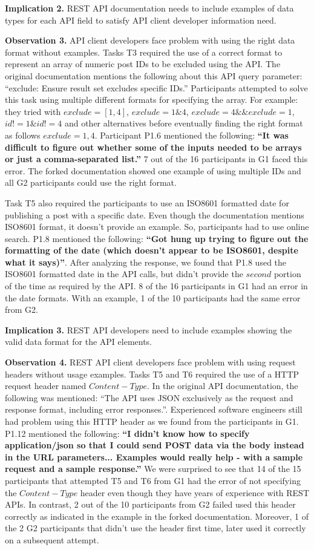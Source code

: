 \documentclass[conference]{IEEEtran}
\begin{document}
\textbf{Implication 2.} REST API documentation needs to include examples of data types for each API field to satisfy API client developer information need.

\textbf{Observation 3.} API client developers face problem with using the right data format without examples. Tasks T3 required the use of a correct format to represent an array of numeric post IDs to be excluded using the API. The original documentation mentions the following about this API query parameter: ``exclude: Ensure result set excludes specific IDs.'' Participants attempted to solve this task using multiple different formats for specifying the array. For example: they tried with $exclude=[1,4]$, $exclude=1\&4$, $exclude=4\&\&exclude=1$, $id!=1\&id!=4$ and other alternatives before eventually finding the right format as follows $exclude=1,4$. Participant P1.6 mentioned the following: \textbf{``It was difficult to figure out whether some of the inputs needed to be arrays or just a comma-separated list.''} 7 out of the 16 participants in G1 faced this error. The forked documentation showed one example of using multiple IDs and all G2 participants could use the right format.

Task T5 also required the participants to use an ISO8601 formatted date for publishing a post with a specific date. Even though the documentation mentions ISO8601 format, it doesn't provide an example. So, participants had to use online search. P1.8 mentioned the following: \textbf{``Got hung up trying to figure out the formatting of the date (which doesn't appear to be ISO8601, despite what it says)''}. After analyzing the response, we found that P1.8 used the ISO8601 formatted date in the API calls, but didn't provide the $second$ portion of the time as required by the API. 8 of the 16 participants in G1 had an error in the date formats. With an example, 1 of the 10 participants had the same error from G2.

\textbf{Implication 3.} REST API developers need to include examples showing the valid data format for the API elements.


\textbf{Observation 4.} REST API client developers face problem with using request headers without usage examples. Tasks T5 and T6 required the use of a HTTP request header named $Content-Type$. In the original API documentation, the following was mentioned: ``The API uses JSON exclusively as the request and response format, including error responses.''. Experienced software engineers still had problem using this HTTP header as we found from the participants in G1. P1.12 mentioned the following: \textbf{``I didn't know how to specify application/json so that I could send POST data via the body instead in the URL parameters... Examples would really help - with a sample request and a sample response.''} We were surprised to see that 14 of the 15 participants that attempted T5 and T6 from G1 had the error of not specifying the $Content-Type$ header even though they have years of experience with REST APIs. In contrast, 2 out of the 10 participants from G2 failed used this header correctly as indicated in the example in the forked documentation. Moreover, 1 of the 2 G2 participants that didn't use the header first time, later used it correctly on a subsequent attempt.
\end{document}
